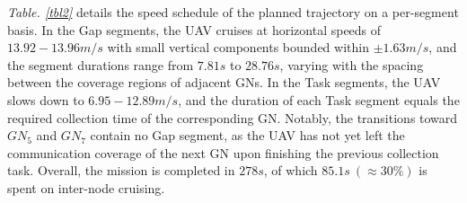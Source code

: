 \textit{Table. \ref{tbl2}} details the speed schedule of the planned trajectory on a per-segment basis.
In the Gap segments, the UAV cruises at horizontal speeds of $13.92-13.96 m/s$ with small vertical components bounded within $\pm 1.63 m/s$, and the segment durations range from $7.81 s$ to $28.76 s$, varying with the spacing between the coverage regions of adjacent GNs.
In the Task segments, the UAV slows down to $6.95-12.89 m/s$, and the duration of each Task segment equals the required collection time of the corresponding GN.
Notably, the transitions toward $GN_5$ and $GN_7$ contain no Gap segment, as the UAV has not yet left the communication coverage of the next GN upon finishing the previous collection task.
Overall, the mission is completed in $278 s$, of which $85.1 s\ (\approx30 \%)$ is spent on inter-node cruising.



